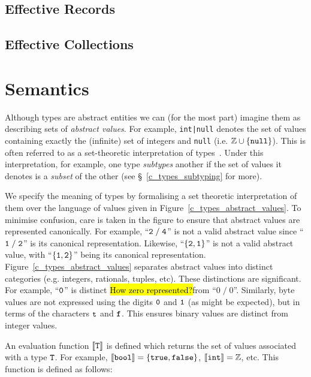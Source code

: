 \subsection{Effective Records}
\label{c_types_effective_records}
\subsection{Effective Collections}

\section{Semantics}
\label{c_types_type_semantics}

Although types are abstract entities we can (for the most part) imagine them as describing sets of {\em abstract values}.  For example, \lstinline{int|null} denotes the set of values containing exactly the (infinite) set of integers and \lstinline{null} (i.e. ${\tt\mathbb{Z}\cup\{null\}}$).  This is often referred to as a set-theoretic interpretation of types~\cite{AW93,Damm94,CF05,FCB08}.  Under this interpretation, for example, one type {\em subtypes}  another if the set of values it denotes is a {\em subset} of the other (see \S~\ref{c_types_subtyping} for more).  

We specify the meaning of types by formalising a set theoretic interpretation of them over the language of values given in Figure~\ref{c_types_abstract_values}.  To minimise confusion, care is taken in the figure to ensure that abstract values are represented canonically.  For example, ``${\tt 2\;/\;4}$'' is not a valid abstract value since ``${\tt 1\;/\;2}$'' is its canonical representation. Likewise, ``${\tt\{2,1\}}$'' is not a valid abstract value, with ``${\tt\{1,2\}}$'' being its canonical representation.   Figure~\ref{c_types_abstract_values} separates abstract values into distinct categories (e.g. integers, rationals, tuples, etc).  These distinctions are significant.  For example, ``${\tt 0}$'' is distinct \hl{How zero represented?}{from} ``${0\;/\;0}$''.  Similarly, byte values are not expressed using the digits ${\tt 0}$ and ${\tt 1}$ (as might be expected), but in terms of the characters ${\tt t}$ and ${\tt f}$.  This ensures binary values are distinct from integer values.

An evaluation function ${\tt\llbracket T\rrbracket}$ is defined which returns the set of values associated with a type ${\tt T}$.  For example, ${\tt\llbracket bool\rrbracket=\{true,false\}}$, ${\tt\llbracket int\rrbracket=\mathbb{Z}}$, etc.  This function is defined as follows:

